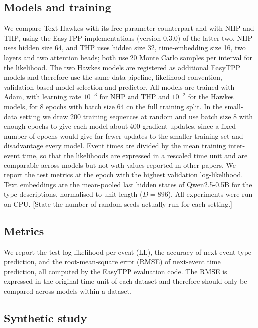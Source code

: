 \documentclass[preprint,12pt,authoryear]{elsarticle}
\newcommand{\todo}[1]{{\color{red}[#1]}}
\begin{document}
\subsection{Models and training}

We compare Text-Hawkes with its free-parameter counterpart and with NHP and THP, using the EasyTPP implementations (version 0.3.0) of the latter two. NHP uses hidden size 64, and THP uses hidden size 32, time-embedding size 16, two layers and two attention heads; both use 20 Monte Carlo samples per interval for the likelihood. The two Hawkes models are registered as additional EasyTPP models and therefore use the same data pipeline, likelihood convention, validation-based model selection and predictor. All models are trained with Adam, with learning rate $10^{-3}$ for NHP and THP and $10^{-2}$ for the Hawkes models, for 8 epochs with batch size 64 on the full training split. In the small-data setting we draw 200 training sequences at random and use batch size 8 with enough epochs to give each model about 400 gradient updates, since a fixed number of epochs would give far fewer updates to the smaller training set and disadvantage every model. Event times are divided by the mean training inter-event time, so that the likelihoods are expressed in a rescaled time unit and are comparable across models but not with values reported in other papers. We report the test metrics at the epoch with the highest validation log-likelihood. Text embeddings are the mean-pooled last hidden states of Qwen2.5-0.5B \citep{qwen2025qwen25} for the type descriptions, normalised to unit length ($D=896$). All experiments were run on CPU. \todo{State the number of random seeds actually run for each setting.}

\subsection{Metrics}

We report the test log-likelihood per event (LL), the accuracy of next-event type prediction, and the root-mean-square error (RMSE) of next-event time prediction, all computed by the EasyTPP evaluation code. The RMSE is expressed in the original time unit of each dataset and therefore should only be compared across models within a dataset.

\subsection{Synthetic study}
\end{document}
